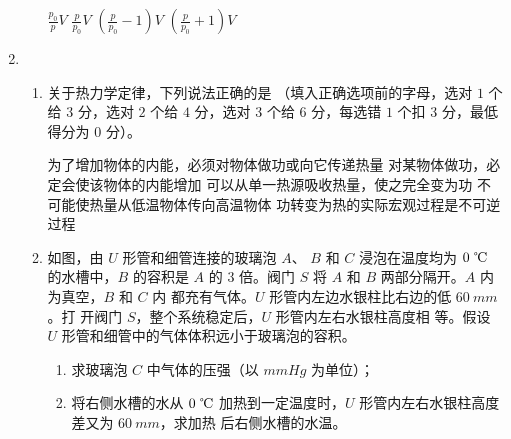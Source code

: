 \begin{enumerate}
\begin{enumerate}
\fourchoices
{$\frac{p_{0}}{p} V$}
{$\frac{p}{p_{0}} V$}
{$\left(\frac{p}{p_{0}}-1\right) V$}
{$\left(\frac{p}{p_{0}}+1\right) V$}
	
	
\end{enumerate}


\item 
{}
\begin{enumerate}
	\item
关于热力学定律，下列说法正确的是 \underlinegap （填入正确选项前的字母，选对 $ 1 $ 个
给 $ 3 $ 分，选对 $ 2 $ 个给 $ 4 $ 分，选对 $ 3 $ 个给 $ 6 $ 分，每选错 $ 1 $ 个扣 $ 3 $ 分，最低得分为 $ 0 $ 分）。


\fivechoices
{为了增加物体的内能，必须对物体做功或向它传递热量}
{对某物体做功，必定会使该物体的内能增加}
{可以从单一热源吸收热量，使之完全变为功}
{不可能使热量从低温物体传向高温物体}
{功转变为热的实际宏观过程是不可逆过程}



\item 
如图，由 $ U $ 形管和细管连接的玻璃泡 $ A $、 $ B $
和 $ C $ 浸泡在温度均为 $ 0 \ \celsius $ 的水槽中，$ B $ 的容积是 $ A $ 的 $ 3 $
倍。阀门 $ S $ 将 $ A $ 和 $ B $ 两部分隔开。$ A $ 内为真空，$ B $ 和 $ C $ 内
都充有气体。$ U $ 形管内左边水银柱比右边的低 $ 60 \ mm $。打
开阀门 $ S $，整个系统稳定后，$ U $ 形管内左右水银柱高度相
等。假设 $ U $ 形管和细管中的气体体积远小于玻璃泡的容积。
\begin{enumerate}
	\item
求玻璃泡 $ C $ 中气体的压强（以 $ mmHg $ 为单位）；
\item 
将右侧水槽的水从 $ 0 \ \celsius $ 加热到一定温度时，$ U $ 形管内左右水银柱高度差又为 $ 60 \ mm $，求加热
后右侧水槽的水温。
	
\end{enumerate}
\begin{figure}[h!]
	\flushright
	
\end{figure}


\end{enumerate}
\end{enumerate}
